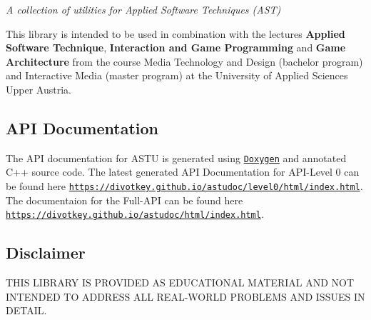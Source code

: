 {\itshape A collection of utilities for Applied Software Techniques (A\+ST)}

This library is intended to be used in combination with the lectures {\bfseries Applied Software Technique}, {\bfseries Interaction and Game Programming} and {\bfseries Game Architecture} from the course Media Technology and Design (bachelor program) and Interactive Media (master program) at the University of Applied Sciences Upper Austria.

\subsection*{A\+PI Documentation}

The A\+PI documentation for A\+S\+TU is generated using \href{https://www.doxygen.nl/index.html}{\tt Doxygen} and annotated C++ source code. The latest generated A\+PI Documentation for A\+P\+I-\/\+Level 0 can be found here \href{https://divotkey.github.io/astudoc/level0/html/index.html}{\tt https\+://divotkey.\+github.\+io/astudoc/level0/html/index.\+html}. The documentaion for the Full-\/\+A\+PI can be found here \href{https://divotkey.github.io/astudoc/html/index.html}{\tt https\+://divotkey.\+github.\+io/astudoc/html/index.\+html}.

\subsection*{Disclaimer}

T\+H\+IS L\+I\+B\+R\+A\+RY IS P\+R\+O\+V\+I\+D\+ED AS E\+D\+U\+C\+A\+T\+I\+O\+N\+AL M\+A\+T\+E\+R\+I\+AL A\+ND N\+OT I\+N\+T\+E\+N\+D\+ED TO A\+D\+D\+R\+E\+SS A\+LL R\+E\+A\+L-\/\+W\+O\+R\+LD P\+R\+O\+B\+L\+E\+MS A\+ND I\+S\+S\+U\+ES IN D\+E\+T\+A\+IL. 